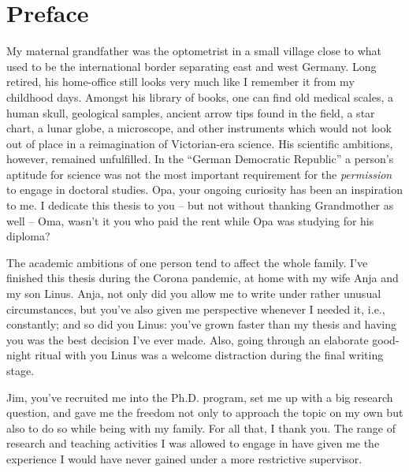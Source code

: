\documentclass[
  10pt, twoside
]{book}
\begin{document}
\tableofcontents

\clearpage


\pagestyle{plain}

\section*{Preface}

My maternal grandfather was the optometrist in a small village close to what used to be the international border separating east and west Germany. Long retired, his home-office still looks very much like I remember it from my childhood days. Amongst his library of books, one can find old medical scales, a human skull, geological samples, ancient arrow tips found in the field, a star chart, a lunar globe, a microscope, and other instruments which would not look out of place in a reimagination of Victorian-era science. His scientific ambitions, however, remained unfulfilled. In the ``German Democratic Republic'' a person's aptitude for science was not the most important requirement for the \emph{permission} to engage in doctoral studies. Opa, your ongoing curiosity has been an inspiration to me. I dedicate this thesis to you -- but not without thanking Grandmother as well -- Oma, wasn't it you who paid the rent while Opa was studying for his diploma?

The academic ambitions of one person tend to affect the whole family. I've finished this thesis during the Corona pandemic, at home with my wife Anja and my son Linus. Anja, not only did you allow me to write under rather unusual circumstances, but you've also given me perspective whenever I needed it, i.e., constantly; and so did you Linus: you've grown faster than my thesis and having you was the best decision I've ever made. Also, going through an elaborate good-night ritual with you Linus was a welcome distraction during the final writing stage.

Jim, you've recruited me into the Ph.D. program, set me up with a big research question, and gave me the freedom not only to approach the topic on my own but also to do so while being with my family. For all that, I thank you. The range of research and teaching activities I was allowed to engage in have given me the experience I would have never gained under a more restrictive supervisor.
  
\end{document}
